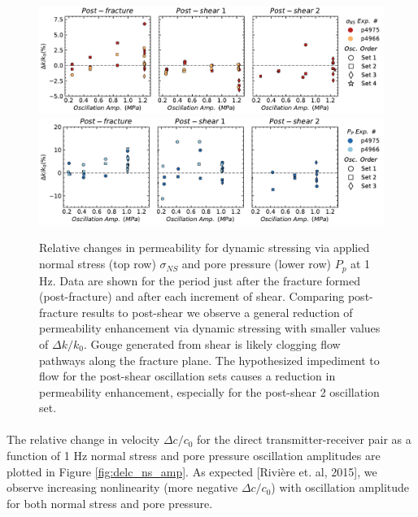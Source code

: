 \documentclass[letterpaper,10pt]{article}
\begin{document}
\clearpage

\begin{figure}[ht]
	\centering
	\includegraphics[width=1\columnwidth]{delk_amp_NS}
	\includegraphics[width=1\columnwidth]{delk_amp_PP}
	\caption{Relative changes in permeability for dynamic stressing via applied normal stress (top row)  $ \sigma_{NS} $ and pore pressure (lower row) $ P_p $ at 1 Hz. Data are shown for the period just after the fracture formed (post-fracture) and after each increment of shear. Comparing post-fracture results to post-shear we observe a general reduction of permeability enhancement via dynamic stressing with smaller values of $ \Delta k/k_0 $. Gouge generated from shear is likely clogging flow pathways along the fracture plane. The hypothesized impediment to flow for the post-shear oscillation sets causes a reduction in permeability enhancement, especially for the post-shear 2 oscillation set.}
	\label{fig:perm_ns_amp}
\end{figure}

\clearpage

\paragraph{}
The relative change in velocity $ \Delta c/c_0 $ for the direct transmitter-receiver pair as a function of 1 Hz normal stress and pore pressure oscillation amplitudes are plotted in Figure \ref{fig:delc_ns_amp}. As expected [Rivière et. al, 2015], we observe increasing nonlinearity (more negative $ \Delta c/c_0 $) with oscillation amplitude for both normal stress and pore pressure. 
\end{document}
